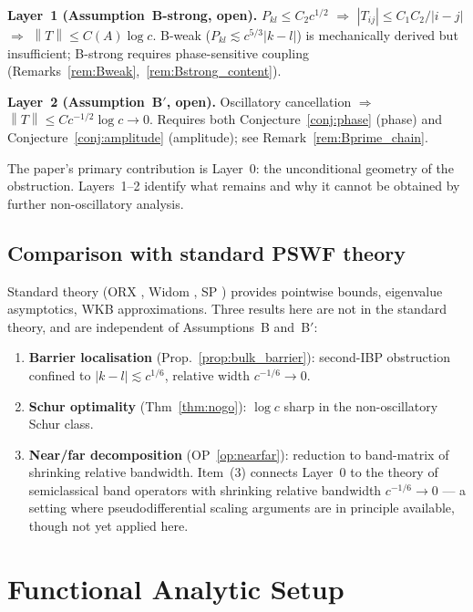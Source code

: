 \documentclass[12pt,a4paper]{article}
\newcommand{\norm}[1]{\left\|#1\right\|}
\begin{document}
\medskip\noindent\textbf{Layer~1 (Assumption~B-strong, open).}
$P_{kl}\leq C_2c^{1/2}$ $\Rightarrow$
$|T_{ij}|\leq C_1C_2/|i-j|$ $\Rightarrow$
$\norm{T}\leq C(A)\log c$.
B-weak ($P_{kl}\lesssim c^{5/3}|k-l|$) is mechanically derived
but insufficient; B-strong requires phase-sensitive coupling
(Remarks~\ref{rem:Bweak},~\ref{rem:Bstrong_content}).

\medskip\noindent\textbf{Layer~2 (Assumption~B$'$, open).}
Oscillatory cancellation $\Rightarrow$
$\norm{T}\leq Cc^{-1/2}\log c\to 0$.
Requires both Conjecture~\ref{conj:phase} (phase) and
Conjecture~\ref{conj:amplitude} (amplitude);
see Remark~\ref{rem:Bprime_chain}.

\medskip\noindent
The paper's primary contribution is Layer~0:
the unconditional geometry of the obstruction.
Layers~1--2 identify what remains and why it cannot be
obtained by further non-oscillatory analysis.

\subsection{Comparison with standard PSWF theory}
\label{sec:new}

Standard theory (ORX \cite{OsipovRokhlinXiao2013},
Widom \cite{Widom64}, SP \cite{SP61}) provides pointwise
bounds, eigenvalue asymptotics, WKB approximations.
Three results here are not in the standard theory, and are
independent of Assumptions~B and~B$'$:

\begin{enumerate}[nosep,label=(\arabic*)]
  \item \textbf{Barrier localisation}
        (Prop.~\ref{prop:bulk_barrier}):
        second-IBP obstruction confined to $|k-l|\lesssim c^{1/6}$,
        relative width $c^{-1/6}\to 0$.
  \item \textbf{Schur optimality} (Thm~\ref{thm:nogo}):
        $\log c$ sharp in the non-oscillatory Schur class.
  \item \textbf{Near/far decomposition}
        (OP~\ref{op:nearfar}):
        reduction to band-matrix of shrinking relative bandwidth.
        Item~(3) connects Layer~0 to the theory of semiclassical
        band operators with shrinking relative bandwidth $c^{-1/6}\to0$
        --- a setting where pseudodifferential scaling arguments
        are in principle available, though not yet applied here.
\end{enumerate}

\section{Functional Analytic Setup}
\end{document}
